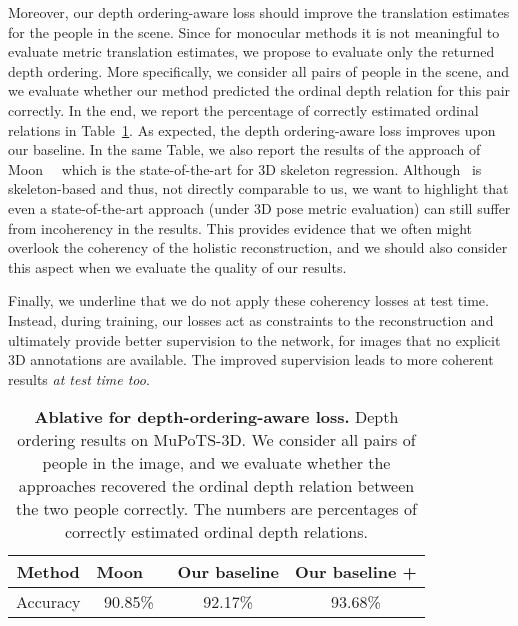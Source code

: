 Moreover, our depth ordering-aware loss should improve the translation estimates for the people in the scene. Since for monocular methods it is not meaningful to evaluate metric translation estimates, we propose to evaluate only the returned depth ordering. More specifically, we consider all pairs of people in the scene, and we evaluate whether our method predicted the ordinal depth relation for this pair correctly. In the end, we report the percentage of correctly estimated ordinal relations in Table~\ref{table:ordering}. As expected, the depth ordering-aware loss improves upon our baseline. In the same Table, we also report the results of the approach of Moon~\etal~\cite{moon2019camera} which is the state-of-the-art for 3D skeleton regression. Although~\cite{moon2019camera} is skeleton-based and thus, not directly comparable to us, we want to highlight that even a state-of-the-art approach (under 3D pose metric evaluation) can still suffer from incoherency in the results. This provides evidence that we often might overlook the coherency of the holistic reconstruction, and we should also consider this aspect when we evaluate the quality of our results.

Finally, we underline that we do not apply these coherency losses at test time. Instead, during training, our losses act as constraints to the reconstruction and ultimately provide better supervision to the network, for images that no explicit 3D annotations are available. The improved supervision leads to more coherent results {\it at test time too}. 


\begin{table}\centering
\footnotesize
	\begin{tabular}{c|c|c|c}
	\toprule
	Method & Moon~\etal~\cite{moon2019camera} & Our baseline & Our baseline +  \\
	\midrule
	Accuracy & 90.85\% & 92.17\% & 93.68\%\\
	\bottomrule
	\end{tabular}
	\caption{\textbf{Ablative for depth-ordering-aware loss.} Depth ordering results on MuPoTS-3D. We consider all pairs of people in the image, and we evaluate whether the approaches recovered the ordinal depth relation between the two people correctly. The numbers are percentages of correctly estimated ordinal depth relations. }
	\vspace{-2mm}
	\label{table:ordering}
\end{table}

